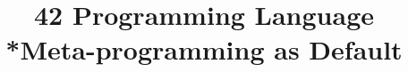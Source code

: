 \documentclass[secfooter,english]{beamer}
\title{42 Programming Language\\*Meta-programming as Default}
\author{}
\institute{}
\date{}
\begin{document}
\maketitle


\logo{}

\end{document}

